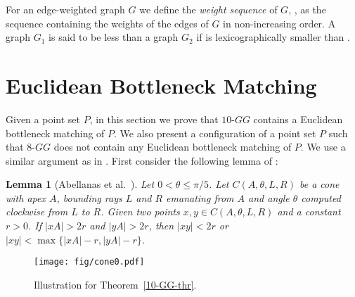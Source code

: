 \documentclass[11pt,a4paper]{article}
\newcommand{\kGG}[2]{$#1\text{-}GG#2$}
\newcommand{\WS}[1]{\text{WS$(#1)$}}
\newtheorem{lemma}{Lemma}
\begin{document}
For an edge-weighted graph $G$ we define the {\em weight sequence} of $G$, \WS{G}, as the sequence containing the weights of the edges of $G$ in non-increasing order. A graph $G_1$ is said to be less than a graph $G_2$ if \WS{G_1} is lexicographically smaller than \WS{G_2}.

\section{Euclidean Bottleneck Matching}
\label{bottleneck-section}
Given a point set $P$, in this section we prove that \kGG{10}{} contains a Euclidean bottleneck matching of $P$. We also present a configuration of a point set $P$ such that \kGG{8}{} does not contain any Euclidean bottleneck matching of $P$. We use a similar argument as in \cite{Abellanas2009, Chang1991}. First consider the following lemma of \cite{Abellanas2009}:
\begin{lemma}[Abellanas et al.~\cite{Abellanas2009}]
\label{cone-lemma}
Let $0 < \theta \le \pi/5$. Let $C(A, \theta, L, R)$ be a cone with apex $A$, bounding rays $L$
and $R$ emanating from $A$ and angle $\theta$ computed clockwise from $L$ to $R$. Given two points $x, y \in C(A, \theta, L, R)$ and a constant $r > 0$. If $|xA| > 2r$ and $|yA|>2r$, then $|xy| < 2r$ or $|xy| < \max\{|xA|− r, |yA|− r\}$.
\end{lemma}

\begin{figure}[htb]
  \centering
  \texttt{[image: fig/cone0.pdf]}
 \caption{Illustration for Theorem~\ref{10-GG-thr}.}
  \label{10-GG-fig}
\end{figure}
\end{document}

